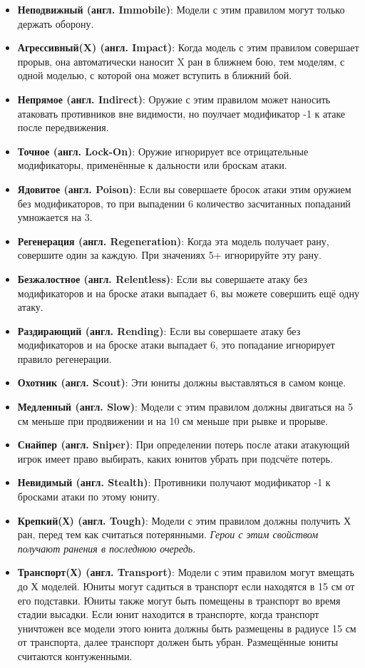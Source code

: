 \documentclass[twocolumn]{article}
\newcommand{\h}[1]{\textbf{#1}}
\begin{document}
\begin{itemize}
    \item \h{Неподвижный (англ. Immobile)}: Модели с этим правилом могут только держать оборону.
    \item \h{Агрессивный(X) (англ. Impact)}: Когда модель с этим правилом совершает прорыв, она автоматически наносит X ран в ближнем бою, тем моделям, с одной моделью, с которой она может вступить в ближний бой.
    \item \h{Непрямое (англ. Indirect)}: Оружие с этим правилом может наносить атаковать противников вне видимости, но поулчает модификатор -1 к атаке после передвижения.
    \item \h{Точное (англ. Lock-On)}: Оружие игнорирует все отрицательные модификаторы, применённые к дальности или броскам атаки.
    \item \h{Ядовитое (англ. Poison)}: Если вы совершаете бросок атаки этим оружием без модификаторов, то при выпадении 6 количество засчитанных попаданий умножается на 3.
    \item \h{Регенерация (англ. Regeneration)}: Когда эта модель получает рану, совершите один за каждую. При значениях 5+ игнорируйте эту рану.
    \item \h{Безжалостное (англ. Relentless)}: Если вы совершаете атаку без модификаторов и на броске атаки выпадает 6, вы можете совершить ещё одну атаку.
    \item \h{Раздирающий (англ. Rending)}: Если вы совершаете атаку без модификаторов и на броске атаки выпадает 6, это попадание игнорирует правило регенерации.
    \item \h{Охотник (англ. Scout)}: Эти юниты должны выставляться в самом конце.
    \item \h{Медленный (англ. Slow)}: Модели с этим правилом должны двигаться на 5 см меньше при продвижении и на 10 см меньше при рывке и прорыве.
    \item \h{Снайпер (англ. Sniper)}: При определении потерь после атаки атакующий игрок имеет право выбирать, каких юнитов убрать при подсчёте потерь.
    \item \h{Невидимый (англ. Stealth)}: Противники получают модификатор -1 к бросками атаки по этому юниту.
    \item \h{Крепкий(Х) (англ. Tough)}: Модели с этим правилом должны получить Х ран, перед тем как считаться потерянными. \emph{Герои с этим свойством получают ранения в последнюю очередь}.
    \item \h{Транспорт(Х) (англ. Transport)}: Модели с этим правилом могут вмещать до Х моделей. Юниты могут садиться в транспорт если находятся в 15 см от его подставки. Юниты также могут быть помещены в транспорт во время стадии высадки. Если юнит находится в транспорте, когда транспорт уничтожен все модели этого юнита должны быть размещены в радиусе 15 см от транспорта, далее транспорт должен быть убран. Размещённые юниты считаются контуженными.
\end{itemize}
\end{document}
